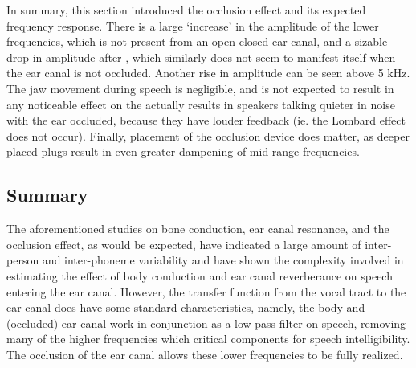 In summary, %
this section introduced the occlusion effect and its expected frequency response.  There is a large `increase' in the amplitude of the lower frequencies, which is not present from an open-closed ear canal, and a sizable drop in amplitude after \DIFdelbegin {}\DIFdelend \DIFaddbegin {}\DIFaddend , which similarly does not seem to manifest itself when the ear canal is not occluded.  Another rise in amplitude can be seen above 5 kHz.  The jaw movement during speech is negligible, and is not expected to result in any noticeable effect on the \DIFdelbegin {}\DIFdelend \DIFaddbegin {}\DIFaddend actually results in speakers talking quieter in noise with the ear occluded, because they have louder feedback (ie. the Lombard effect does not occur).  Finally, placement of the occlusion device does matter, as deeper placed plugs result in even greater dampening of mid-range frequencies.


\subsection{Summary}

The aforementioned studies on bone conduction, ear canal resonance, and the occlusion effect, as would be expected, have indicated a large amount of inter-person and inter-phoneme variability and have shown the complexity involved in estimating the effect of body conduction and ear canal reverberance on speech entering the ear canal.  However, the transfer function from the vocal tract to the ear canal does have some standard characteristics, namely, the body and (occluded) ear canal work in conjunction as a low-pass filter on speech, removing many of the higher frequencies which \DIFdelbegin {}\DIFdelend \DIFaddbegin {}\DIFaddend critical components for speech intelligibility.  The occlusion of the ear canal allows these lower frequencies \DIFaddbegin {}\DIFaddend to be fully realized.



